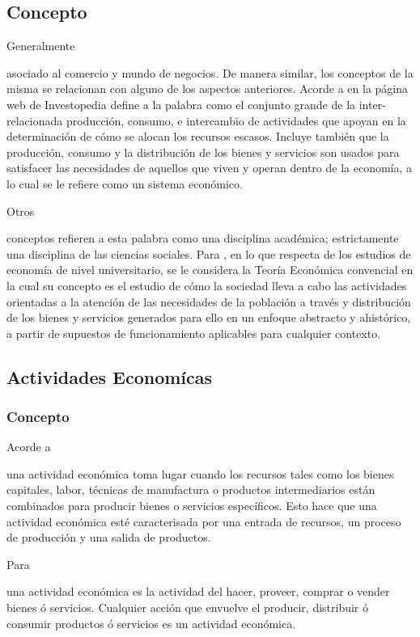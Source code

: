 \documentclass[stu, 12pt, letterpaper, donotrepeattitle, floatsintext, natbib]{apa7}
\begin{document}
\subsection{Concepto}  
Generalmente \begin{justifying}
    asociado al comercio y mundo de negocios. De manera similar, los conceptos de la misma se relacionan con alguno de los aspectos anteriores.
Acorde a \cite{kenton-no-date}
en la página web de Investopedia define a la palabra como el conjunto grande de la inter-relacionada producción, consumo, e intercambio de actividades que apoyan en la determinación
de cómo se alocan los recursos escasos. Incluye también que la producción, consumo y la distribución de los bienes y servicios son usados para satisfacer las 
necesidades de aquellos que viven y operan dentro de la economía, a lo cual se le refiere como un sistema económico.\par
\end{justifying}
Otros \begin{justifying}
    conceptos refieren a esta palabra como una disciplina académica; estrictamente una disciplina de las ciencias sociales. Para \cite{alburquerque-2018}, en lo que respecta de los estudios
de economía de nivel universitario, se le considera la Teoría Económica convencial en la cual su concepto es el estudio de cómo la sociedad lleva a cabo las actividades
orientadas a la atención de las necesidades de la población a través y distribución de los bienes y servicios generados para ello en un enfoque abstracto y ahistórico, a partir
de supuestos de funcionamiento aplicables para cualquier contexto.\par
\end{justifying}
\vspace{\baselineskip}
\subsection{Actividades Economícas}
\subsubsection{Concepto}
Acorde a \cite{unknown-author-no-dateA} %
    \begin{justifying}
        una actividad económica toma lugar cuando los recursos tales como los bienes capitales, labor, técnicas de manufactura
        o productos intermediarios están combinados para producir bienes o servicios específicos. Esto hace que una actividad
        económica esté caracterisada por una entrada de recursos, un proceso de producción y una salida de productos.\par
    \end{justifying}
Para \cite{market-business-news-2019} %
    \begin{justifying}
        una actividad económica es la actividad del hacer, proveer, comprar o vender bienes ó servicios. Cualquier acción que envuelve el producir,
        distribuir ó consumir productos ó servicios es un actividad económica.\par
    \end{justifying}
\vspace{\baselineskip}
\end{document}
